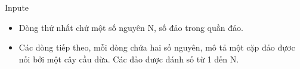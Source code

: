 Inpute
\begin{itemize}
	\item     Dòng thứ nhất chứ một số nguyên N, số đảo trong quần đảo.   
	\item     Các dòng tiếp theo, mỗi dòng chứa hai số nguyên, mô tả một cặp đảo đựơc nối bởi một cây cầu dừa. Các đảo được đánh số từ 1 đến N.   
\end{itemize}